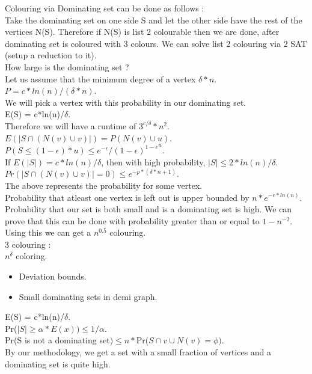 \documentclass[solution,addpoints,12pt]{exam}
\begin{document}
Colouring via Dominating set can be done as follows :\\
Take the dominating set on one side S and let the other side have
the rest of the vertices N(S). Therefore if N(S) is list 2
colourable then we are done, after dominating set is coloured with 3
colours. We can solve list 2 colouring via 2 SAT (setup a reduction to it).\\
How large is the dominating set ?\\
Let us assume that the minimum degree of a vertex $\delta*n$.\\
$P = c*ln(n)/(\delta*n)$.\\
We will pick a vertex with this probability in our dominating set.\\
E(S) = c*ln(n)/$\delta$.\\
Therefore we will have a runtime of $3^{c/\delta}*n^2$.\\
$E(|S \cap (N(v) \cup v)|) = P(N(v) \cup u)$.\\
$P(S \le (1 - \epsilon)*u) \le {e^{-\epsilon}/{(1-\epsilon)}^{1 - \epsilon}}^u$.\\
If $E(|S|) = c*ln(n)/\delta$, then with high
probability, $|S| \le 2*ln(n)/\delta$.\\
$Pr(|S \cap (N(v) \cup v)| = 0) \le e^{-p*(\delta*n + 1)}$.\\
The above represents the probability for some vertex.\\
Probability that atleast one vertex is left out is upper bounded by
$n*e^{-c*ln(n)}$.\\
Probability that our set is both small and is a dominating set is
high. We can prove that this can be done with probability
greater than or equal to $1 - n^{-2}$.\\
Using this we can get a $n^{0.5}$ colouring.\\
3 colouring :\\
$n^{\delta}$ coloring.\\
\begin{itemize}
\item Deviation bounds.
\item Small dominating sets in demi graph.
\end{itemize}
E(S) = c*ln(n)/$\delta$.\\
Pr($|S| \ge \alpha*E(x)) \le 1/\alpha$.\\
Pr(S is not a dominating set$) \le n*$Pr($S \cap v \cup N(v) = \phi)$.\\
By our methodology, we get a set with a small fraction of vertices
and a dominating set is quite high.\\
\end{document}
